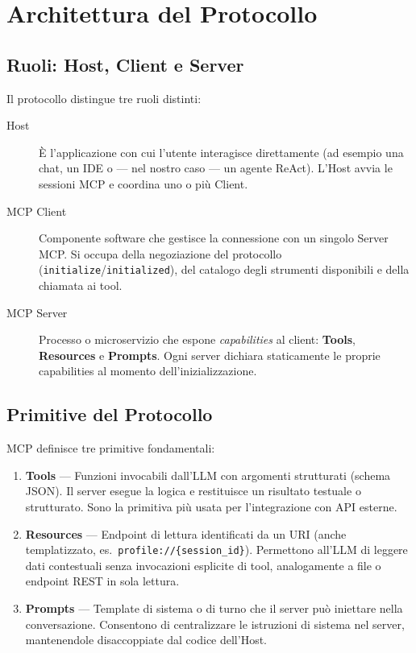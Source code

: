 \section{Architettura del Protocollo}
\label{sec:mcp-arch}

\subsection{Ruoli: Host, Client e Server}
\label{subsec:mcp-roles}

Il protocollo distingue tre ruoli distinti:

\begin{description}
    \item[Host] È l'applicazione con cui l'utente interagisce
        direttamente (ad esempio una chat, un IDE o — nel nostro caso —
        un agente ReAct). L'Host avvia le sessioni MCP e coordina uno
        o più Client.

    \item[MCP Client] Componente software che gestisce la connessione
        con un singolo Server MCP. Si occupa della negoziazione del
        protocollo (\texttt{initialize}/\texttt{initialized}), del
        catalogo degli strumenti disponibili e della chiamata ai tool.

    \item[MCP Server] Processo o microservizio che espone
        \emph{capabilities} al client: \textbf{Tools}, \textbf{Resources}
        e \textbf{Prompts}. Ogni server dichiara staticamente le proprie
        capabilities al momento dell'inizializzazione.
\end{description}

\subsection{Primitive del Protocollo}
\label{subsec:mcp-primitives}

MCP definisce tre primitive fondamentali:

\begin{enumerate}
    \item \textbf{Tools} — Funzioni invocabili dall'LLM con argomenti
        strutturati (schema JSON). Il server esegue la logica e
        restituisce un risultato testuale o strutturato. Sono la
        primitiva più usata per l'integrazione con API esterne.

    \item \textbf{Resources} — Endpoint di lettura identificati da un
        URI (anche templatizzato, es.\ \texttt{profile://\{session\_id\}}).
        Permettono all'LLM di leggere dati contestuali senza invocazioni
        esplicite di tool, analogamente a file o endpoint REST in sola
        lettura.

    \item \textbf{Prompts} — Template di sistema o di turno che il
        server può iniettare nella conversazione. Consentono di
        centralizzare le istruzioni di sistema nel server, mantenendole
        disaccoppiate dal codice dell'Host.
\end{enumerate}

